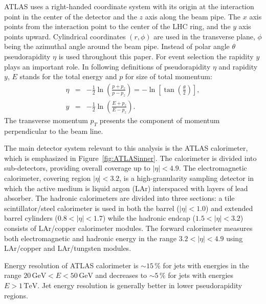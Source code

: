 \documentclass[a4paper,11pt]{report}
\newcommand{\TeV}{\,\text{TeV}}
\newcommand{\GeV}{\,\text{GeV}}
\newcommand{\pt}{p_T}
\begin{document}
ATLAS uses a right-handed coordinate system with its origin at the interaction
point in the center of the detector and the $z$ axis along the beam pipe. The
$x$ axis points from the interaction point to the center of the LHC ring, and
the $y$ axis points upward. Cylindrical coordinates $(r, \phi)$ are used in the
transverse plane, $\phi$ being the azimuthal angle around the beam pipe. Instead
of polar angle $\theta$ pseudorapidity $\eta$ is used throughout this paper. For
event selection the rapidity $y$ plays an important role. In following
definitions of pseudorapidity $\eta$ and rapidity $y$, $E$ stands for the total
energy and $p$ for size of total momentum: 
\begin{eqnarray}
  \eta &= & - \frac{1}{2} \ln \left( \frac{p+p_z}{p-p_z} \right) = - \ln \left[
  \tan \left( \frac{\theta}{2} \right) \right], \\ y &= &- \frac{1}{2} \ln
  \left( \frac{E+p_z}{E-p_z} \right).	
\end{eqnarray}
The transverse momentum $\pt$ presents the component of momentum perpendicular
to the beam line.  

The main detector system relevant to this analysis is the ATLAS calorimeter,
which is emphasized in Figure~\ref{fig:ATLASinner}. The calorimeter is divided
into sub-detectors, providing overall coverage up to $|\eta| < 4.9$. The
electromagnetic calorimeter, covering region $|\eta| < 3.2$, is a
high-granularity sampling detector in which the active medium is liquid argon
(LAr) interspaced with layers of lead absorber. The hadronic calorimeters are
divided into three sections: a tile scintillator/steel calorimeter is used in
both the barrel ($|\eta| < 1.0$) and extended barrel cylinders ($0.8 < |\eta| <
1.7$) while the hadronic endcap ($1.5 < |\eta| < 3.2$) consists of LAr/copper
calorimeter modules. The forward calorimeter measures both electromagnetic and
hadronic energy in the range $3.2 < |\eta| < 4.9$ using LAr/copper and
LAr/tungsten modules. 

Energy resolution of ATLAS calorimeter \cite{JetEnergyResolution} is $\sim
15\,\%$ for jets with energies in the range $20 \GeV < E < 50 \GeV$ and
decreases to $\sim 5\,\%$ for jets with energies $E > 1 \TeV$. Jet energy
resolution is generally better in lower pseudorapidity regions. 


\clearpage
\listoffigures
{}


\clearpage
\listoftables
{}



\clearpage


\end{document}
